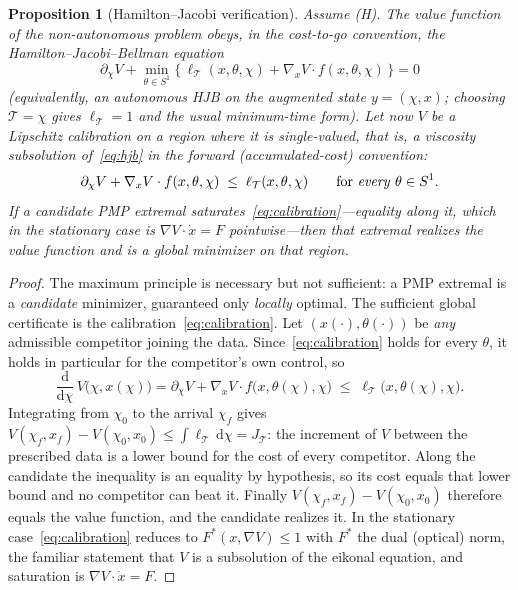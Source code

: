 \documentclass[12pt]{iopart}
\newcommand{\dd}{\mathrm{d}}
\theoremstyle{plain}
\newtheorem{proposition}[theorem]{Proposition}
\theoremstyle{definition}
\theoremstyle{plain}
\theoremstyle{remark}
\newcommand{\Ithm}[1]{\setcounter{theorem}{\numexpr#1-1\relax}}
\begin{document}
\Ithm{3}
\begin{proposition}[Hamilton--Jacobi verification]\label{prop:hjb}
Assume (H). The value function of the non-autonomous problem obeys, in the cost-to-go
convention, the Hamilton--Jacobi--Bellman equation
\begin{equation}
  \partial_\chi V+\min_{\theta\in S^1}\big\{\,\ell_{\mathcal T}(x,\theta,\chi)
  +\nabla_x V\cdot f(x,\theta,\chi)\,\big\}=0
  \label{eq:hjb}
\end{equation}
(equivalently, an autonomous HJB on the augmented state $y=(\chi,x)$; choosing
$\mathcal T=\chi$ gives $\ell_{\mathcal T}=1$ and the usual minimum-time form).
Let now $V$ be a Lipschitz \emph{calibration} on a region where it is single-valued,
that is, a viscosity subsolution of~\eqref{eq:hjb} in the forward (accumulated-cost)
convention:
\begin{equation}
  \partial_\chi V+\nabla_x V\cdot f(x,\theta,\chi)\;\le\;\ell_{\mathcal T}(x,\theta,\chi)
  \qquad\text{for \emph{every} }\theta\in S^1 .
  \label{eq:calibration}
\end{equation}
If a candidate PMP extremal \emph{saturates}~\eqref{eq:calibration}---equality along it,
which in the stationary case is $\nabla V\cdot\dot x=F$ pointwise---then that extremal
realizes the value function and is a \emph{global} minimizer on that region.
\end{proposition}

\begin{proof}
The maximum principle is necessary but not sufficient: a PMP extremal is a
\emph{candidate} minimizer, guaranteed only \emph{locally} optimal. The sufficient global
certificate is the calibration~\eqref{eq:calibration}. Let $(x(\cdot),\theta(\cdot))$ be
\emph{any} admissible competitor joining the data. Since~\eqref{eq:calibration} holds for
every $\theta$, it holds in particular for the competitor's own control, so
\[
   \frac{\dd}{\dd\chi}\,V\big(\chi,x(\chi)\big)
   =\partial_\chi V+\nabla_x V\cdot f\big(x,\theta(\chi),\chi\big)
   \;\le\;\ell_{\mathcal T}\big(x,\theta(\chi),\chi\big).
\]
Integrating from $\chi_0$ to the arrival $\chi_f$ gives
$V(\chi_f,x_f)-V(\chi_0,x_0)\le\int\ell_{\mathcal T}\,\dd\chi=J_{\mathcal T}$: the
increment of $V$ between the prescribed data is a lower bound for the cost of every
competitor. Along the candidate the inequality is an equality by hypothesis, so its cost
equals that lower bound and no competitor can beat it. Finally
$V(\chi_f,x_f)-V(\chi_0,x_0)$ therefore equals the value function, and the candidate
realizes it. In the stationary case~\eqref{eq:calibration} reduces to
$F^\ast(x,\nabla V)\le1$ with $F^\ast$ the dual (optical) norm, the familiar statement
that $V$ is a subsolution of the eikonal equation, and saturation is
$\nabla V\cdot\dot x=F$.
\end{proof}
\end{document}
